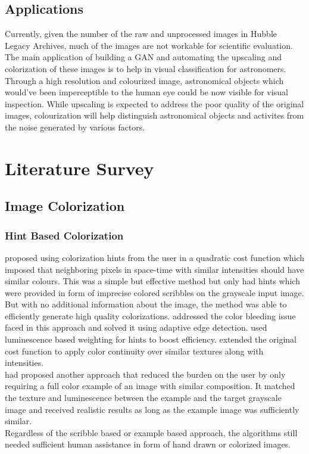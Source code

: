 \documentclass[oneside,a4paper,12pt]{report}
\begin{document}
\section{Applications}
\hspace*{0.25 in}Currently, given the number of the raw and unprocessed images in Hubble Legacy Archives, much of the images are not workable for scientific evaluation. The main application of building a GAN and automating the upscaling and colorization of these images is to help in visual classification for astronomers. Through a high resolution and colourized image, astronomical objects which would've been imperceptible to the human eye could be now visible for visual inspection. While upscaling is expected to address the poor quality of the original images, colourization will help distinguish astronomical objects and activites from the noise generated by various factors.

\chapter{Literature Survey}
\section{Image Colorization}
\subsection{Hint Based Colorization}
\hspace*{0.25 in}\citet{levin2004colorization} proposed using colorization hints from the user in a quadratic cost function which imposed that neighboring pixels in space-time with similar intensities should have similar colours. This was a simple but effective method but only had hints which were provided in form of imprecise colored scribbles on the grayscale input image. But with no additional information about the image, the method was able to efficiently generate high quality colorizations. \cite{huang2005edge} addressed the color bleeding issue faced in this approach and solved it using adaptive edge detection. \cite{yatziv2006chrominance} used luminescence based weighting for hints to boost efficiency. \cite{qu2006manga} extended the original cost function to apply color continuity over similar textures along with intensities.\\
		\hspace*{0.25 in}\cite{welsh2002color} had proposed another approach that reduced the burden on the user by only requiring a full color example of an image with similar composition. It matched the texture and luminescence between the example and the target grayscale image and received realistic results as long as the example image was sufficiently similar.\\
		\hspace*{0.25 in}Regardless of the scribble based or example based approach, the algorithms still needed sufficient human assistance in form of hand drawn or colorized images.
\end{document}
